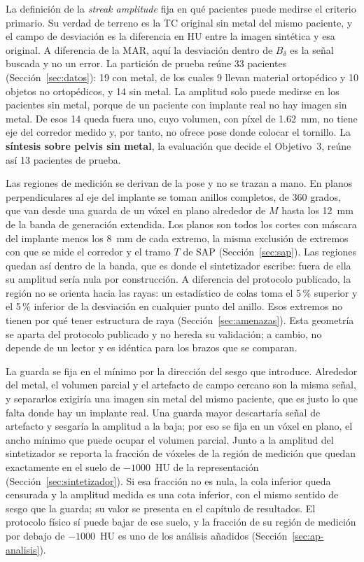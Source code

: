 La definición de la \emph{streak amplitude} fija en qué pacientes puede medirse el criterio primario. Su verdad de terreno es la TC original sin metal del mismo paciente, y el campo de desviación es la diferencia en HU entre la imagen sintética y esa original. A diferencia de la MAR, aquí la desviación dentro de $B_{\delta}$ es la señal buscada y no un error. La partición de prueba reúne 33 pacientes (Sección~\ref{sec:datos}): 19 con metal, de los cuales 9 llevan material ortopédico y 10 objetos no ortopédicos, y 14 sin metal. La amplitud solo puede medirse en los pacientes sin metal, porque de un paciente con implante real no hay imagen sin metal. De esos 14 queda fuera uno, cuyo volumen, con píxel de 1.62~mm, no tiene eje del corredor medido y, por tanto, no ofrece pose donde colocar el tornillo. La \textbf{síntesis sobre pelvis sin metal}, la evaluación que decide el Objetivo~3, reúne así 13 pacientes de prueba.

Las regiones de medición se derivan de la pose y no se trazan a mano. En planos perpendiculares al eje del implante se toman anillos completos, de 360 grados, que van desde una guarda de un vóxel en plano alrededor de $M$ hasta los 12~mm de la banda de generación extendida. Los planos son todos los cortes con máscara del implante menos los 8~mm de cada extremo, la misma exclusión de extremos con que se mide el corredor y el tramo $T$ de SAP (Sección~\ref{sec:sap}). Las regiones quedan así dentro de la banda, que es donde el sintetizador escribe: fuera de ella su amplitud sería nula por construcción. A diferencia del protocolo publicado, la región no se orienta hacia las rayas: un estadístico de colas toma el 5\,\% superior y el 5\,\% inferior de la desviación en cualquier punto del anillo. Esos extremos no tienen por qué tener estructura de raya (Sección~\ref{sec:amenazas}). Esta geometría se aparta del protocolo publicado y no hereda su validación; a cambio, no depende de un lector y es idéntica para los brazos que se comparan.

La guarda se fija en el mínimo por la dirección del sesgo que introduce. Alrededor del metal, el volumen parcial y el artefacto de campo cercano son la misma señal, y separarlos exigiría una imagen sin metal del mismo paciente, que es justo lo que falta donde hay un implante real. Una guarda mayor descartaría señal de artefacto y sesgaría la amplitud a la baja; por eso se fija en un vóxel en plano, el ancho mínimo que puede ocupar el volumen parcial. Junto a la amplitud del sintetizador se reporta la fracción de vóxeles de la región de medición que quedan exactamente en el suelo de $-1000$~HU de la representación (Sección~\ref{sec:sintetizador}). Si esa fracción no es nula, la cola inferior queda censurada y la amplitud medida es una cota inferior, con el mismo sentido de sesgo que la guarda; su valor se presenta en el capítulo de resultados. El protocolo físico sí puede bajar de ese suelo, y la fracción de su región de medición por debajo de $-1000$~HU es uno de los análisis añadidos (Sección~\ref{sec:ap-analisis}).

